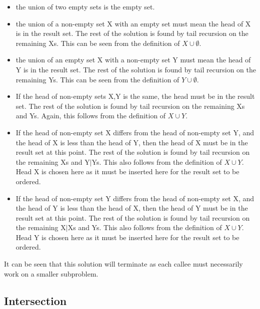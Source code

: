 \documentclass[]{article}
\begin{document}
\begin{itemize}
	\item the union of two empty sets is the empty set.
	
	\item the union of a non-empty set X with an empty set must mean the head of X is in the result set. The rest of the solution is found by tail recursion on the remaining Xs. This can be seen from the definition of $X \cup \emptyset$.
	
	\item the union of an empty set X with a non-empty set Y must mean the head of Y is in the result set. The rest of the solution is found by tail recursion on the remaining Ys. This can be seen from the definition of $Y \cup \emptyset$.
	
	\item If the head of non-empty sets X,Y is the same, the head must be in the result set. The rest of the solution is found by tail recursion on the remaining Xs and Ys. Again, this follows from the definition of $X \cup Y$.
	
	\item If the head of non-empty set X differs from the head of non-empty set Y, and the head of X is less than the head of Y, then the head of X must be in the result set at this point. The rest of the solution is found by tail recursion on the remaining Xs and Y$|$Ys. This also follows from the definition of $X \cup Y$. Head X is chosen here as it must be inserted here for the result set to be ordered. 
	
	\item If the head of non-empty set Y differs from the head of non-empty set X, and the head of Y is less than the head of X, then the head of Y must be in the result set at this point. The rest of the solution is found by tail recursion on the remaining X$|$Xs and Ys. This also follows from the definition of $X \cup Y$. Head Y is chosen here as it must be inserted here for the result set to be ordered.  

\end{itemize}

It can be seen that this solution will terminate as each callee must necessarily work on a smaller subproblem.\par   

\subsection{Intersection} %
\label{sec:intersection}
\end{document}
